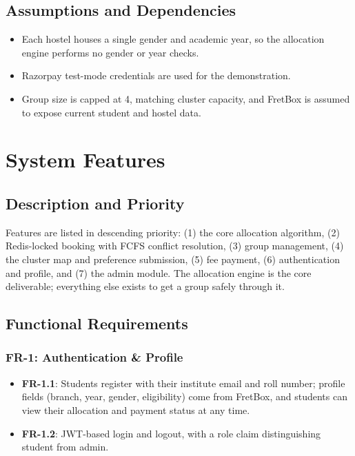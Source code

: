 \documentclass[11pt]{report}
\begin{document}
\section{Assumptions and Dependencies}
\begin{itemize}[leftmargin=1.2cm]
    \item Each hostel houses a single gender and academic year, so the allocation engine performs no gender or year checks.
    \item Razorpay test-mode credentials are used for the demonstration.
    \item Group size is capped at 4, matching cluster capacity, and FretBox is assumed to expose current student and hostel data.
\end{itemize}

\chapter{System Features}

\section{Description and Priority}
Features are listed in descending priority: (1) the core allocation algorithm, (2) Redis-locked
booking with FCFS conflict resolution, (3) group management, (4) the cluster map and preference
submission, (5) fee payment, (6) authentication and profile, and (7) the admin module. The allocation
engine is the core deliverable; everything else exists to get a group safely through it.

\section{Functional Requirements}

\subsection*{FR-1: Authentication \& Profile}
\begin{itemize}[leftmargin=1.2cm]
    \item \textbf{FR-1.1}: Students register with their institute email and roll number; profile fields (branch, year, gender, eligibility) come from FretBox, and students can view their allocation and payment status at any time.
    \item \textbf{FR-1.2}: JWT-based login and logout, with a role claim distinguishing student from admin.
\end{itemize}
\end{document}
